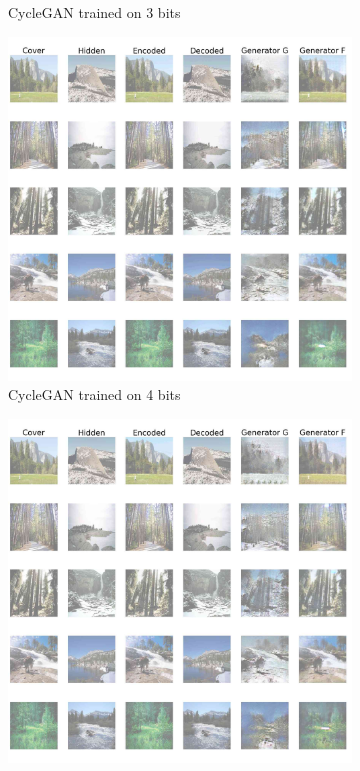 \documentclass[conference]{IEEEtran}
\begin{document}
\begin{figure}[!hbt]
\begin{subfigure}[b]{0.28\textwidth}
            \caption{CycleGAN trained on 3 bits}
            \label{cycle_gan_3}
    \end{subfigure}
    \hspace{0.05\textwidth}
    \begin{subfigure}[b]{0.28\textwidth}
    \centering
            \includegraphics[scale=0.08]{images/cycle_sten_4.jpg}
            \caption{CycleGAN trained on 4 bits}
            \label{cycle_gan_4}
    \end{subfigure}
    \hspace{0.05\textwidth}
    \begin{subfigure}[b]{0.28\textwidth}
    \centering
            \includegraphics[scale=0.08]{images/cycle_sten_5.jpg}

\end{subfigure}
\end{figure}
\end{document}
